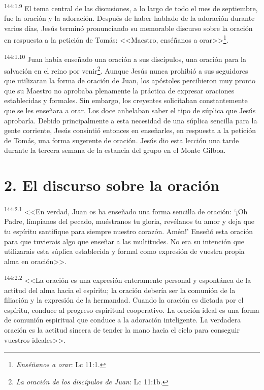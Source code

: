 \par 
\textsuperscript{144:1.9} El tema central de las discusiones, a lo largo de todo el mes de septiembre, fue la oración y la adoración. Después de haber hablado de la adoración durante varios días, Jesús terminó pronunciando su memorable discurso sobre la oración en respuesta a la petición de Tomás: <<Maestro, enséñanos a orar>>\footnote{\textit{Enséñanos a orar}: Lc 11:1.}.

\par 
\textsuperscript{144:1.10} Juan había enseñado una oración a sus discípulos, una oración para la salvación en el reino por venir\footnote{\textit{La oración de los discípulos de Juan}: Lc 11:1b.}. Aunque Jesús nunca prohibió a sus seguidores que utilizaran la forma de oración de Juan, los apóstoles percibieron muy pronto que su Maestro no aprobaba plenamente la práctica de expresar oraciones establecidas y formales. Sin embargo, los creyentes solicitaban constantemente que se les enseñara a orar. Los doce anhelaban saber el tipo de súplica que Jesús aprobaría. Debido principalmente a esta necesidad de una súplica sencilla para la gente corriente, Jesús consintió entonces en enseñarles, en respuesta a la petición de Tomás, una forma sugerente de oración. Jesús dio esta lección una tarde durante la tercera semana de la estancia del grupo en el Monte Gilboa.

\section*{2. El discurso sobre la oración}
\par 
\textsuperscript{144:2.1} <<En verdad, Juan os ha enseñado una forma sencilla de oración: `¡Oh Padre, límpianos del pecado, muéstranos tu gloria, revélanos tu amor y deja que tu espíritu santifique para siempre nuestro corazón. Amén!' Enseñó esta oración para que tuvierais algo que enseñar a las multitudes. No era su intención que utilizarais esta súplica establecida y formal como expresión de vuestra propia alma en oración>>.

\par 
\textsuperscript{144:2.2} <<La oración es una expresión enteramente personal y espontánea de la actitud del alma hacia el espíritu; la oración debería ser la comunión de la filiación y la expresión de la hermandad. Cuando la oración es dictada por el espíritu, conduce al progreso espiritual cooperativo. La oración ideal es una forma de comunión espiritual que conduce a la adoración inteligente. La verdadera oración es la actitud sincera de tender la mano hacia el cielo para conseguir vuestros ideales>>.

